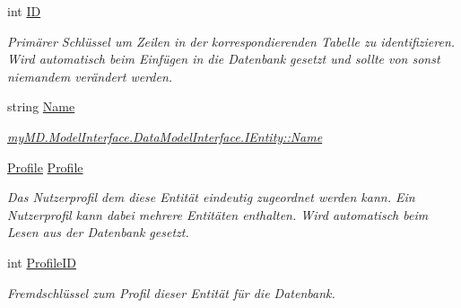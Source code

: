 \begin{CompactItemize}
\item 
\hypertarget{classmy_m_d_1_1_model_1_1_data_model_1_1_entity_b718adec73e04ce3ec720dd11a06a308}{
int \hyperlink{classmy_m_d_1_1_model_1_1_data_model_1_1_entity_b718adec73e04ce3ec720dd11a06a308}{ID}}
\label{d7/d0a/classmy_m_d_1_1_model_1_1_data_model_1_1_entity_b718adec73e04ce3ec720dd11a06a308}

\begin{CompactList}\small\item\em Prim\"{a}rer Schl\"{u}ssel um Zeilen in der korrespondierenden Tabelle zu identifizieren. Wird automatisch beim Einf\"{u}gen in die Datenbank gesetzt und sollte von sonst niemandem ver\"{a}ndert werden. \item\end{CompactList}\item 
\hypertarget{classmy_m_d_1_1_model_1_1_data_model_1_1_entity_49ee3087348e8d44e1feda1917443987}{
string \hyperlink{classmy_m_d_1_1_model_1_1_data_model_1_1_entity_49ee3087348e8d44e1feda1917443987}{Name}}
\label{d7/d0a/classmy_m_d_1_1_model_1_1_data_model_1_1_entity_49ee3087348e8d44e1feda1917443987}

\begin{CompactList}\small\item\em \hyperlink{interfacemy_m_d_1_1_model_interface_1_1_data_model_interface_1_1_i_entity_49ee3087348e8d44e1feda1917443987}{my\-MD.Model\-Interface.Data\-Model\-Interface.IEntity::Name} \item\end{CompactList}\item 
\hypertarget{classmy_m_d_1_1_model_1_1_data_model_1_1_entity_cce99c598cfdb9773ab041d54c3d973a}{
\hyperlink{classmy_m_d_1_1_model_1_1_data_model_1_1_profile}{Profile} \hyperlink{classmy_m_d_1_1_model_1_1_data_model_1_1_entity_cce99c598cfdb9773ab041d54c3d973a}{Profile}}
\label{d7/d0a/classmy_m_d_1_1_model_1_1_data_model_1_1_entity_cce99c598cfdb9773ab041d54c3d973a}

\begin{CompactList}\small\item\em Das Nutzerprofil dem diese Entit\"{a}t eindeutig zugeordnet werden kann. Ein Nutzerprofil kann dabei mehrere Entit\"{a}ten enthalten. Wird automatisch beim Lesen aus der Datenbank gesetzt. \item\end{CompactList}\item 
\hypertarget{classmy_m_d_1_1_model_1_1_data_model_1_1_entity_dc82268d83d81e9cc62b809b61099abc}{
int \hyperlink{classmy_m_d_1_1_model_1_1_data_model_1_1_entity_dc82268d83d81e9cc62b809b61099abc}{Profile\-ID}}
\label{d7/d0a/classmy_m_d_1_1_model_1_1_data_model_1_1_entity_dc82268d83d81e9cc62b809b61099abc}

\begin{CompactList}\small\item\em Fremdschl\"{u}ssel zum Profil dieser Entit\"{a}t f\"{u}r die Datenbank. \item\end{CompactList}\end{CompactItemize}


